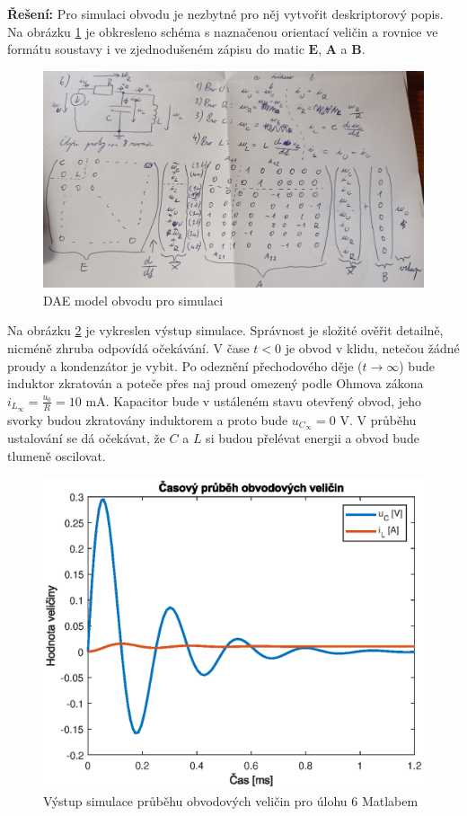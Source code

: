 \documentclass[twoside]{article}
\begin{document}
\textbf{Řešení:}
Pro simulaci obvodu je nezbytné pro něj vytvořit deskriptorový popis. Na obrázku \ref{fig:obvod_soustava_pro_simulaci} je
obkresleno schéma s naznačenou orientací veličin a rovnice ve formátu soustavy i ve zjednodušeném zápisu do matic $\mathbf{E}$, $\mathbf{A}$ a $\mathbf{B}$.

\begin{figure}[H]
	\centering
	\includegraphics[width=.75\linewidth]{obvod_rovnice_pro_simulaci.jpg}
	\caption{DAE model obvodu pro simulaci}
	\label{fig:obvod_soustava_pro_simulaci}
\end{figure}

Na obrázku \ref{fig:obvod} je vykreslen výstup simulace. Správnost je složité ověřit detailně,
nicméně zhruba odpovídá očekávání. V čase $t < 0$ je obvod v klidu, netečou žádné proudy
a kondenzátor je vybit. Po odeznění přechodového děje ($t \to \infty$) bude induktor zkratován a poteče přes naj
proud omezený podle Ohmova zákona $i_{L_{\infty}} = \frac{u_0}{R} = 10 \text{ mA}$. Kapacitor
bude v ustáleném stavu otevřený obvod, jeho svorky budou zkratovány induktorem a proto bude $u_{C_\infty} = 0 \text{ V}$.
V průběhu ustalování se dá očekávat, že $C$ a $L$ si budou přelévat energii a obvod bude tlumeně oscilovat.

\begin{figure}[H]
	\centering
	\includegraphics{obvod_prubehy.eps}
	\caption{Výstup simulace průběhu obvodových veličin pro úlohu 6 Matlabem}
	\label{fig:obvod}
\end{figure}
\newpage
\end{document}
